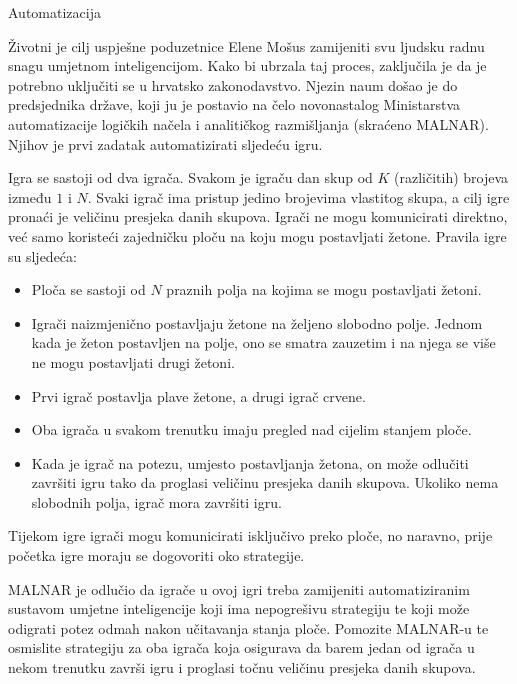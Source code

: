 \begin{statement}[
  problempoints=100,
  timelimit=1 sekunda,
  memorylimit=512 MiB,
]{Automatizacija}

Životni je cilj uspješne poduzetnice Elene Mošus zamijeniti svu ljudsku radnu snagu 
umjetnom inteligencijom. 
Kako bi ubrzala taj proces, zaključila je da je potrebno uključiti se u hrvatsko zakonodavstvo. 
Njezin naum došao je do  
predsjednika države, koji ju je postavio na čelo novonastalog 
Ministarstva automatizacije logičkih načela i analitičkog razmišljanja 
(skraćeno MALNAR). 
Njihov je prvi zadatak automatizirati sljedeću igru. 

Igra se sastoji od dva igrača. 
Svakom je igraču dan skup od $K$ (različitih) brojeva između $1$ i $N$. 
Svaki igrač ima pristup jedino brojevima vlastitog skupa, a cilj igre 
pronaći je veličinu presjeka danih skupova. 
Igrači ne mogu komunicirati direktno, već samo koristeći zajedničku ploču 
na koju mogu postavljati žetone. 
Pravila igre su sljedeća:
\begin{itemize}[noitemsep,topsep=0pt,parsep=0pt,partopsep=0pt]
  \item 
  Ploča se sastoji od $N$ praznih polja na kojima se mogu postavljati žetoni. 

  \item 
  Igrači naizmjenično postavljaju žetone na željeno slobodno polje. 
  Jednom kada je žeton postavljen na polje, ono se smatra zauzetim i na njega se više 
  ne mogu postavljati drugi žetoni. 

  \item 
  Prvi igrač postavlja plave žetone, a drugi igrač crvene.

  \item 
  Oba igrača u svakom trenutku imaju pregled nad cijelim stanjem ploče. 

  \item 
  Kada je igrač na potezu, umjesto postavljanja žetona, on može odlučiti 
  završiti igru tako da proglasi veličinu presjeka danih skupova. 
  Ukoliko nema slobodnih polja, igrač mora završiti igru. 
\end{itemize}
Tijekom igre igrači mogu komunicirati isključivo preko ploče, no naravno, 
prije početka igre moraju se dogovoriti oko strategije. 

MALNAR je odlučio da igrače u ovoj igri treba zamijeniti 
automatiziranim sustavom umjetne inteligencije koji ima nepogrešivu strategiju te koji 
može odigrati potez odmah nakon učitavanja stanja ploče. 
Pomozite MALNAR-u te osmislite strategiju za oba igrača 
koja osigurava da barem jedan od igrača u nekom trenutku završi igru i proglasi 
točnu veličinu presjeka danih skupova. 


\end{statement}
